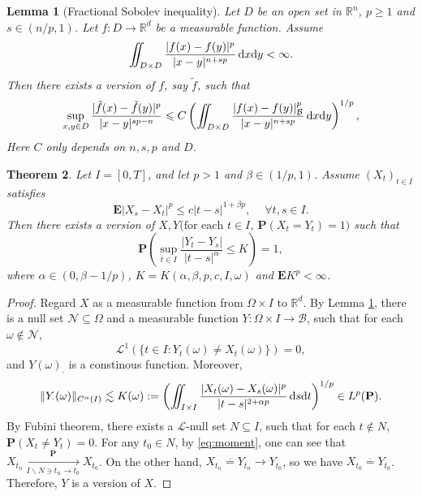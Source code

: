 \documentclass[twoside, 12pt]{book}
\numberwithin{equation}{chapter}
\newtheorem{theorem}{Theorem}[section]
\newtheorem{lemma}[theorem]{Lemma}
\def\cB{{\mathcal B}}
\def\cN{{\mathcal N}}
\def\mP{{\mathbb P}}
\def\mR{{\mathbb R}}
\def\bE{{\mathbf E}}
\def\bP{{\mathbf P}}
\def\sL{{\mathscr L}}
\def\l{\left}
\def\r{\right}
\def\geq{\geqslant}
\def\leq{\leqslant}
\def\d{\text{\rm{d}}}
\begin{document}
	
	\begin{lemma}[Fractional Sobolev inequality]\label{Le:GRRI}
		Let $D$ be an open set in $\mR^n$, $p\geq 1$ and $s\in (n/p,1)$. Let $f:D\to \mR^d$ be a measurable function. Assume \begin{align*}
			\iint_{D\times D}\frac{|f(x)-f(y)|^p}{|x-y|^{n+sp}}\, \d x \d y<\infty. 
		\end{align*}
		Then there exists a version of $f$, say $\tilde f$, such that 
		\begin{equation}
			\sup_{x,y\in D}\frac{|\tilde f(x)-\tilde f(y)|^p}{|x-y|^{sp-n}}\leq C \l(\iint_{D\times D} \frac{|f(x)-f(y)|_{\cB}^p}{|x-y|^{n+sp}}\, \d x\d y\r)^{1/p}, 
		\end{equation}
		Here $C$ only depends on $n,s,p$ and $D$. 
	\end{lemma}
	
	\begin{theorem}\label{Thm:K2}
		Let $I=[0,T]$, and let $p>1$ and $\beta\in(1/p,1)$. Assume $(X_t)_{t\in I}$ satisfies  
		\begin{equation}\label{eq:moment}
			\bE |X_s-X_t|^p \leq c |t-s|^{1+\beta p}, \quad ~\forall t,s\in I. 
		\end{equation}
		Then there exists a version of $X, Y (\mbox{for each }t\in I$, $\bP(X_t=Y_t)=1)$ such that  
		\[
		\bP\l(\sup_{t\in I}\frac{|Y_t-Y_s|}{|t-s|^\alpha}\leq K\r) =1, 
		\]
		where $\alpha\in (0,\beta-1/p)$, $K=K(\alpha,\beta,p,c,I,\omega)$ and $\bE K^p<\infty$. 
	\end{theorem}
	\begin{proof}
		Regard $X$ as a measurable function from  $\Omega\times I$ to $\mR^d$. By Lemma \ref{Le:GRRI}, there is a null set $\cN\subseteq \Omega$ and a measurable function $Y: \Omega\times I \to \cB$, such that for each $\omega\notin \cN$, 
		\[
		\sL^1\l(\{ t\in I: Y_t(\omega)\neq X_t(\omega)\}\r)=0, 
		\]
		and $Y(\omega)_{\cdot}$ is a constinous function. Moreover, 
		\[
		\|Y_{\cdot}(\omega)\|_{C^{\alpha}(I)}\lesssim  K(\omega):= \l(\iint_{I\times I} \frac{|X_t(\omega)-X_s(\omega)|^p}{|t-s|^{2+\alpha p}}\, \d s \d t\r)^{1/p}\in L^p(\bP).
		\]
		By Fubini theorem, there exists a $\sL$-null set $N\subseteq I$, such that for each $t\notin N$, $\bP(X_t\neq Y_t)=0$. For any $t_0\in N$, by \eqref{eq:moment}, one can see that $X_{t_n} \xrightarrow[I\backslash N \ni t_n \to t_0]{\bP} X_{t_0}$. On the other hand, $X_{t_n}\overset{\cdot}{=}Y_{t_n}\to Y_{t_0}$, so we have $X_{t_0}\overset{\cdot}{=}Y_{t_0}$. Therefore, $Y$ is a version of $X$.  
	\end{proof}
	
\end{document}
